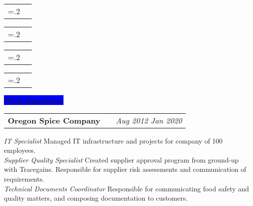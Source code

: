 \documentclass[letterpaper,12pt]{article}[leftmargin=*]
\newcommand{\experience}[2]{\vspace{6pt}
  \colorbox{Blue}{\color{white}#1\hspace{9pt}\raggedbottom\normalsize\textbf{#2\hspace{4pt}}}
}
\newcommand{\resumeSectionStart}{\begin{itemize}[leftmargin=0.1in]}
\newcommand{\resumeSectionEnd}{\end{itemize}}
\newcommand{\resumeSkill}[2]{
  \vspace{-3pt}
  \item[]
    \begin{tabularx}{0.97\textwidth}{>{\hsize=.2\hsize}X X }
      {\textbf{#1}} & {\small#2} \\
    \end{tabularx}
  \vspace{-3pt}
}
\newcommand{\resumeExperience}[3]{
  \vspace{-3pt}
  \item[]
    \begin{tabularx}{0.97\textwidth}{>{\raggedright}X >{\raggedright\arraybackslash}X >{\raggedleft\arraybackslash}X}
      \textbf{\color{primary}#1} & \textit{\color{accent}#2} & \textit{\color{accent}\small#3} \\
    \end{tabularx}
}
\newcommand{\tag}[1]{%
  \tikzmarknode[fill=white,fill
opacity=0,draw=subtle!60!subtle,thick,rounded corners,inner sep=0.4ex,text height=1.5ex,text depth=.25ex, text opacity=1]{test}{\hspace{1pt}\small{#1}\hspace{1pt}}
}
\begin{document}
\resumeSectionStart{
  \resumeSkill{Python}{
    \tag{Pandas}
    \tag{NumPy}
    \tag{SciPy}
    \tag{SciKit-Learn}
    \tag{NLTK}
    \tag{spaCy}
    \tag{Matplotlib}
    \tag{Seaborn}
    \tag{SQLAlchemy}
    \tag{Conda}
  }
  \resumeSkill{Languages}{
    \tag{SQL}
    \tag{Regex}
    \tag{HTML/CSS/Javascript}
    \tag{C/C++}
    \tag{Latex}
  }

  \resumeSkill{Data Science}{
    \tag{ETL \& Data Cleaning}
    \tag{Machine Learning}
    \tag{Natural Language Processing}
    \tag{Web Scraping}
    \tag{ML Pipelines}
    \tag{Database Design}
  }



  \resumeSkill{Tools}{
    \tag{Plotly Dash}
    \tag{PostgreSQL}
    \tag{SQL Server}
    \tag{SQLite}
    \tag{Git \& GitHub}
    \tag{Excel}
    \tag{JIRA}
    \tag{Linux Admin}
    \tag{Database Admin}
    \tag{Windows Server Admin}
  }

}
\resumeSectionEnd{}

\experience{\faPieChart}{Work Experience}

\resumeSectionStart{
  \resumeExperience{Oregon Spice Company}{}{Aug 2012 \textemdash{} Jan 2020}
  \textit{\color{accent}IT Specialist} \textemdash{} Managed IT infrastructure and projects for company of 100 employees.\\
  \textit{\color{accent}Supplier Quality Specialist} \textemdash{} Created supplier approval program from ground-up with Tracegains. Responsible for supplier risk assessments and communication of requirements.\\
  \textit{\color{accent}Technical Documents Coordinator} \textemdash{} Responsible for communicating food safety and quality matters, and composing documentation to customers.
}
\vspace{-6pt}
\resumeSectionEnd{}
\end{document}
